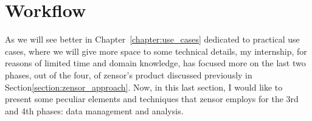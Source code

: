 \section{Workflow}\label{section:workflow}
As we will see better in Chapter~\ref{chapter:use_cases} dedicated to practical use cases, where we will give more space to some technical details, 
my internship, for reasons of limited time and domain knowledge, has focused more on the last two phases, out of the four, of zensor's product discussed previously in Section\ref{section:zensor_approach}. 
Now, in this last section, I would like to present some peculiar elements and techniques that zensor employs for the 3rd and 4th phases: data management and analysis.

